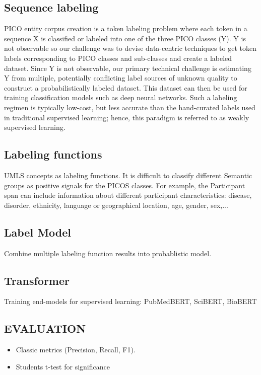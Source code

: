 \documentclass[10.7pt,]{article}
\begin{document}
\subsection{Sequence labeling}\label{data}
%
PICO entity corpus creation is a token labeling problem where each token in a sequence X is classified or labeled into one of the three PICO classes (Y).
Y is not observable so our challenge was to devise data-centric techniques to get token labels corresponding to PICO classes and sub-classes and create a labeled dataset.
Since Y is not observable, our primary technical challenge is estimating Y from multiple, potentially conflicting label sources of unknown quality to construct a probabilistically labeled dataset.
This dataset can then be used for training classification models such as deep neural networks.
Such a labeling regimen is typically low-cost, but less accurate than the hand-curated labels used in traditional supervised learning; hence, this paradigm is referred to as weakly supervised learning.
%
%
%
\subsection{Labeling functions}\label{lfs}
%
UMLS concepts as labeling functions. It is difficult to classify different Semantic groups as positive signals for the PICOS classes. For example, the Participant span can include information about different participant characteristics: disease, disorder, ethnicity, language or geographical location, age, gender, sex,... 
%
%
%
\subsection{Label Model}\label{lfs}
%
Combine multiple labeling function results into probablistic model.
%
%
%
\subsection{Transformer}\label{lfs}
%
Training end-models for supervised learning: PubMedBERT, SciBERT, BioBERT
%
%
%
\subsection{EVALUATION}\label{eval}
%
\begin{itemize}
    \item Classic metrics (Precision, Recall, F1).
    \item Students t-test for significance
\end{itemize}
%
%
%
\end{document}
